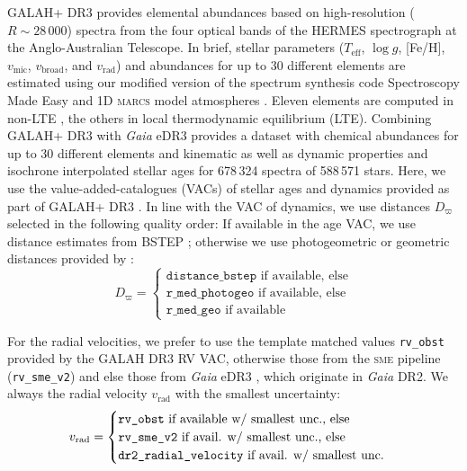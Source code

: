 \documentclass[fleqn,usenatbib]{mnras}
\newcommand{\Gaia}{\textit{Gaia}\xspace} %
\begin{document}
GALAH+ DR3 provides elemental abundances based on high-resolution ($R \sim 28\,000$) spectra from the four optical bands of the HERMES spectrograph \citep{Sheinis2015} at the Anglo-Australian Telescope. In brief, stellar parameters ($T_\text{eff}$, $\log g$, [Fe/H], $v_\text{mic}$, $v_\text{broad}$, and $v_\text{rad}$) and abundances for up to 30 different elements are estimated using our modified version of the spectrum synthesis code Spectroscopy Made Easy \citep[\textsc{sme}][]{Valenti1996, Piskunov2017} and 1D \textsc{marcs} model atmospheres \citep{Gustafsson2008}. Eleven elements are computed in non-LTE \citep{Amarsi2020}, the others in local thermodynamic equilibrium (LTE). Combining GALAH+ DR3 with \Gaia eDR3 provides a dataset with chemical abundances for up to 30 different elements and kinematic as well as dynamic properties and isochrone interpolated stellar ages for 678\,324 spectra of 588\,571 stars. Here, we use the value-added-catalogues (VACs) of stellar ages and dynamics provided as part of GALAH+ DR3 \citep{Buder2021}. In line with the VAC of dynamics, we use distances $D_\varpi$ selected in the following quality order: If available in the age VAC, we use distance estimates from BSTEP \citep[a Bayesian isochrone interpolation tool used as part of GALAH+ DR3][]{Sharma2018}; otherwise we use photogeometric or geometric distances provided by \citet{BailerJones2021}:
\begin{equation} \label{eq:best_distance}
D_\varpi =
\begin{cases}
\texttt{distance\_bstep} \text{ if available, else} \\
\texttt{r\_med\_photogeo} \text{ if available, else} \\
\texttt{r\_med\_geo} \text{ if available}
\end{cases}
\end{equation}

For the radial velocities, we prefer to use the template matched values \texttt{rv\_obst} provided by the GALAH DR3 RV VAC, otherwise those from the \textsc{sme} pipeline (\texttt{rv\_sme\_v2}) and else those from \Gaia eDR3 \citep{Katz2019}, which originate in \Gaia DR2. We always the radial velocity $v_\text{rad}$ with the smallest uncertainty:
\begin{equation} \label{eq:best_rv}
\centering
v_\text{rad} =
\begin{cases}
\texttt{rv\_obst} \text{ if available w/ smallest unc., else} \\
\texttt{rv\_sme\_v2} \text{ if avail. w/ smallest unc., else} \\
\texttt{dr2\_radial\_velocity} \text{ if avail. w/ smallest unc.}
\end{cases}
\end{equation}
\end{document}
